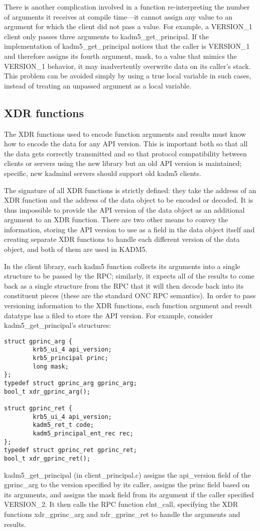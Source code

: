 There is another complication involved in a function re-interpreting
the number of arguments it receives at compile time---it cannot assign
any value to an argument for which the client did not pass a value.
For example, a VERSION_1 client only passes three arguments to
kadm5_get_principal.  If the implementation of kadm5_get_principal
notices that the caller is VERSION_1 and therefore assigns its fourth
argument, mask, to a value that mimics the VERSION_1 behavior, it may
inadvertently overwrite data on its caller's stack.  This problem can
be avoided simply by using a true local variable in such cases,
instead of treating an unpassed argument as a local variable.

\subsection{XDR functions}

The XDR functions used to encode function arguments and results must
know how to encode the data for any API version.  This is important
both so that all the data gets correctly transmitted and so that
protocol compatibility between clients or servers using the new
library but an old API version is maintained; specific, new kadmind
servers should support old kadm5 clients.

The signature of all XDR functions is strictly defined: they take the
address of an XDR function and the address of the data object to be
encoded or decoded.  It is thus impossible to provide the API version
of the data object as an additional argument to an XDR function.
There are two other means to convey the information, storing the API
version to use as a field in the data object itself and creating
separate XDR functions to handle each different version of the data
object, and both of them are used in KADM5.

In the client library, each kadm5 function collects its arguments into
a single structure to be passed by the RPC; similarly, it expects all
of the results to come back as a single structure from the RPC that it
will then decode back into its constituent pieces (these are the
standard ONC RPC semantics).  In order to pass versioning information
to the XDR functions, each function argument and result datatype has a
filed to store the API version.  For example, consider
kadm5_get_principal's structures:
%
\begin{verbatim}
struct gprinc_arg {
        krb5_ui_4 api_version;
        krb5_principal princ;
        long mask;
};
typedef struct gprinc_arg gprinc_arg;
bool_t xdr_gprinc_arg();

struct gprinc_ret {
        krb5_ui_4 api_version;
        kadm5_ret_t code;
        kadm5_principal_ent_rec rec;
};
typedef struct gprinc_ret gprinc_ret;
bool_t xdr_gprinc_ret();
\end{verbatim}
%
kadm5_get_principal (in client_principal.c) assigns the api_version
field of the gprinc_arg to the version specified by its caller,
assigns the princ field based on its arguments, and assigns the mask
field from its argument if the caller specified VERSION_2.  It then
calls the RPC function clnt_call, specifying the XDR functions
xdr_gprinc_arg and xdr_gprinc_ret to handle the arguments and results.

